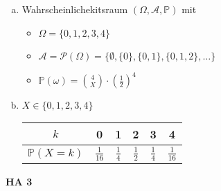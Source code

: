 \documentclass[a4paper,12pt]{article}
\newcommand{\Aufgabe}[1]{
        {
        \vspace*{0.5cm}
        \textbf{HA #1}
        \vspace*{0.2cm}
    }
}
\begin{document}
    \begin{enumerate}[(a)]
        \item 
        
        Wahrscheinlichekitsraum $ (\Omega, \mathcal{A}, \mathbb{P}) $ mit

        \begin{itemize}
            \item 
            $ \Omega = \{0, 1, 2, 3, 4\} $

            \item
            $ \mathcal{A} = \mathcal{P}(\Omega) = \{\emptyset, \{0\}, \{0, 1\}, \{0, 1, 2\}, \dots\} $ 
    
            \item
            $ \displaystyle \mathbb{P}(\omega) = \binom{4}{X} \cdot (\frac{1}{2})^4 $
        \end{itemize}

        \item

        $ X \in \{0, 1, 2, 3, 4\} $

        \bigskip

        \setlength{\tabcolsep}{10pt} %
        \renewcommand{\arraystretch}{2.5} %
        \begin{tabular}{c|c|c|c|c|c}
            $ k $ & 0 & 1 & 2 & 3 & 4 \\
            \hline
            $ \displaystyle \mathbb{P}(X = k) $ & $ \displaystyle \frac{1}{16} $ & $ \displaystyle \frac{1}{4} $ & $ \displaystyle \frac{1}{2} $ & $ \displaystyle \frac{1}{4} $ & $ \displaystyle\frac{1}{16} $ \\
        \end{tabular}
    \end{enumerate}

    \Aufgabe{3}
    
\end{document}

